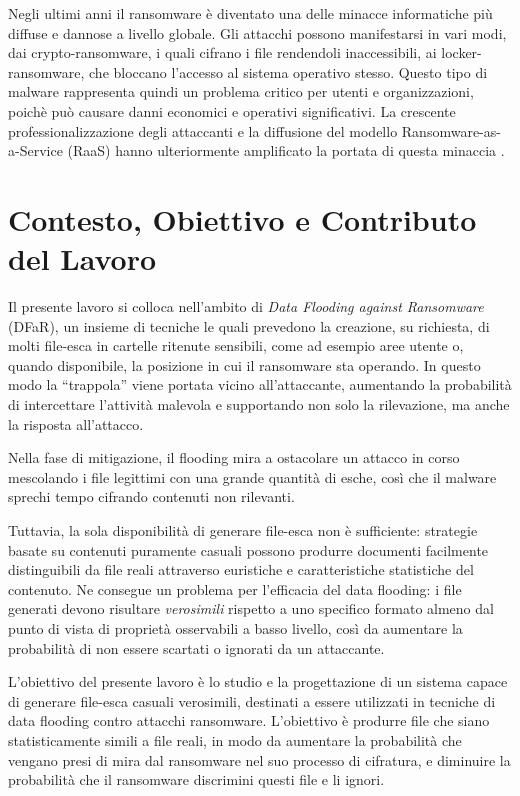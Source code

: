 \documentclass{report}
\begin{document}
\bigskip
Negli ultimi anni il ransomware è diventato una delle minacce informatiche più diffuse e dannose a livello globale. Gli attacchi possono manifestarsi in vari modi, dai crypto-ransomware, i quali cifrano i file rendendoli inaccessibili, ai locker-ransomware, che bloccano l'accesso al sistema operativo stesso.
Questo tipo di malware rappresenta quindi un problema critico per utenti e organizzazioni, poichè può causare danni economici e operativi significativi.
La crescente professionalizzazione degli attaccanti e la diffusione del modello Ransomware-as-a-Service (RaaS) hanno ulteriormente amplificato la portata di questa minaccia \cite{alshaikh2020ransomware}.

\section{Contesto, Obiettivo e Contributo del Lavoro}

Il presente lavoro si colloca nell’ambito di \emph{Data Flooding against Ransomware} (DFaR),
un insieme di tecniche le quali prevedono la creazione, su richiesta,
di molti file-esca in cartelle ritenute sensibili, come ad esempio aree utente o, quando disponibile,
la posizione in cui il ransomware sta operando.
In questo modo la “trappola” viene portata vicino all’attaccante, aumentando la probabilità
di intercettare l’attività malevola e supportando non solo la rilevazione, ma anche la risposta
all’attacco.

\bigskip

Nella fase di mitigazione, il flooding mira a ostacolare un attacco in corso mescolando i file legittimi
con una grande quantità di esche, così che il malware sprechi tempo cifrando contenuti non rilevanti.

\bigskip

Tuttavia, la sola disponibilità di generare file-esca non è sufficiente: strategie basate su contenuti
puramente casuali possono produrre documenti facilmente distinguibili da file reali attraverso euristiche
e caratteristiche statistiche del contenuto. Ne consegue un problema per l’efficacia del data flooding:
i file generati devono risultare \emph{verosimili} rispetto a uno specifico formato almeno dal punto di vista
di proprietà osservabili a basso livello, così da aumentare la probabilità di non
essere scartati o ignorati da un attaccante. 

\bigskip

L'obiettivo del presente lavoro è lo studio e la progettazione di un sistema capace di generare file-esca casuali
verosimili, destinati a essere utilizzati in tecniche di data flooding contro attacchi ransomware.
L'obiettivo è produrre file che siano statisticamente simili a file reali,
in modo da aumentare la probabilità che vengano presi di mira dal ransomware nel suo processo di cifratura,
e diminuire la probabilità che il ransomware discrimini questi file e li ignori.
\end{document}
